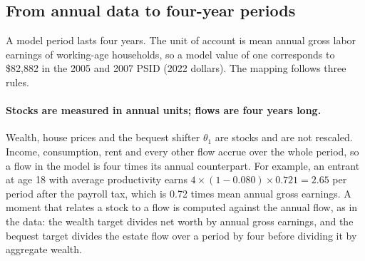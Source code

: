\subsection{From annual data to four-year periods}
\label{sec:quant-period}

A model period lasts four years. The unit of account is mean annual gross
labor earnings of working-age households, so a model value of one corresponds
to \$82,882 in the 2005 and 2007 PSID (2022 dollars).
The mapping follows three rules.

\paragraph{Stocks are measured in annual units; flows are four years long.}
Wealth, house prices and the bequest shifter $\theta_1$ are stocks and are not
rescaled. Income, consumption, rent and every other flow accrue over the whole
period, so a flow in the model is four times its annual counterpart. For
example, an entrant at age 18 with average productivity earns
$4\times(1-0.080)\times0.721=2.65$ per period after the payroll tax, which is
0.72 times mean annual gross earnings.
A moment that relates a stock to a flow is computed against the annual flow,
as in the data: the wealth target divides net worth by annual gross earnings,
and the bequest target divides the estate flow over a period by four before
dividing it by aggregate wealth.

